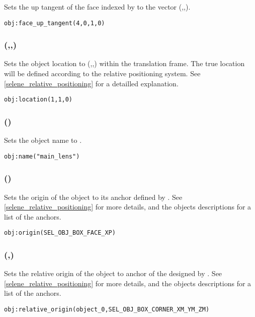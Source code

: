 Sets the up tangent of the face indexed by  to the vector (,,).
\begin{lstlisting}
obj:face_up_tangent(4,0,1,0)
\end{lstlisting}

\subsubsection[location]{(,,)}

Sets the object location to (,,) within the translation frame. The true location will be defined according to the relative positioning system. See \ref{selene_relative_positioning} for a detailled explanation.
\begin{lstlisting}
obj:location(1,1,0)
\end{lstlisting}

\subsubsection[name]{()}

Sets the object name to .
\begin{lstlisting}
obj:name("main_lens")
\end{lstlisting}

\subsubsection[origin]{()}

Sets the origin of the object to its anchor defined by . See \ref{selene_relative_positioning} for more details, and the objects descriptions for a list of the anchors.
\begin{lstlisting}
obj:origin(SEL_OBJ_BOX_FACE_XP)
\end{lstlisting}

\subsubsection[relative\_origin]{(,)}

Sets the relative origin of the object to anchor of the  designed by . See \ref{selene_relative_positioning} for more details, and the objects descriptions for a list of the anchors.
\begin{lstlisting}
obj:relative_origin(object_0,SEL_OBJ_BOX_CORNER_XM_YM_ZM)
\end{lstlisting}

